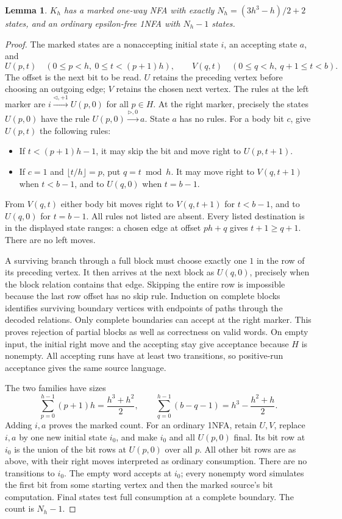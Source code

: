 \documentclass[11pt]{article}
\newtheorem{lemma}[theorem]{Lemma}
\begin{document}
\begin{lemma}\label{lem:source}
$K_h$ has a marked one-way NFA with exactly
$N_h=(3h^3-h)/2+2$ states, and an ordinary epsilon-free 1NFA with
$N_h-1$ states.
\end{lemma}
\begin{proof}
The marked states are a nonaccepting initial state $i$, an accepting state
$a$, and
\[
 U(p,t)\quad(0\le p<h,\ 0\le t<(p+1)h),\qquad
 V(q,t)\quad(0\le q<h,\ q+1\le t<b).
\]
The offset is the next bit to be read. $U$ retains the preceding vertex
before choosing an outgoing edge; $V$ retains the chosen next vertex.
The rules at the left marker are $i\xrightarrow{\lhd,+1}U(p,0)$ for
all $p\in H$. At the right marker, precisely the states $U(p,0)$ have
the rule $U(p,0)\xrightarrow{\rhd,0}a$. State $a$ has no rules.
For a body bit $c$, give $U(p,t)$ the following rules:
\begin{itemize}
\item If $t<(p+1)h-1$, it may skip the bit and move right to $U(p,t+1)$.
\item If $c=1$ and $\lfloor t/h\rfloor=p$, put $q=t\bmod h$.
It may move right to $V(q,t+1)$ when $t<b-1$, and to $U(q,0)$ when $t=b-1$.
\end{itemize}
From $V(q,t)$ either body bit moves right to $V(q,t+1)$ for $t<b-1$,
and to $U(q,0)$ for $t=b-1$. All rules not listed are absent. Every
listed destination is in the displayed state ranges: a chosen edge at
offset $ph+q$ gives $t+1\ge q+1$. There are no left moves.

A surviving branch through a full block must choose exactly one $1$ in
the row of its preceding vertex. It then arrives at the next block as
$U(q,0)$, precisely when the block relation contains that edge. Skipping
the entire row is impossible because the last row offset has no skip rule.
Induction on complete blocks identifies surviving boundary vertices with
endpoints of paths through the decoded relations. Only complete boundaries
can accept at the right marker. This proves rejection of partial blocks
as well as correctness on valid words. On empty input, the initial right
move and the accepting stay give acceptance because $H$ is nonempty.
All accepting runs have at least two transitions, so positive-run acceptance
gives the same source language.

The two families have sizes
\[
 \sum_{p=0}^{h-1}(p+1)h=\frac{h^3+h^2}{2},\qquad
 \sum_{q=0}^{h-1}(b-q-1)=h^3-\frac{h^2+h}{2}.
\]
Adding $i,a$ proves the marked count.
For an ordinary 1NFA, retain $U,V$, replace $i,a$ by one new initial
state $i_0$, and make $i_0$ and all $U(p,0)$ final. Its bit row at $i_0$
is the union of the bit rows at $U(p,0)$ over all $p$. All other bit rows
are as above, with their right moves interpreted as ordinary consumption.
There are no transitions to $i_0$. The empty word accepts at $i_0$;
every nonempty word simulates the first bit from some starting vertex and
then the marked source's bit computation. Final states test full consumption
at a complete boundary. The count is $N_h-1$.
\end{proof}
\end{document}
